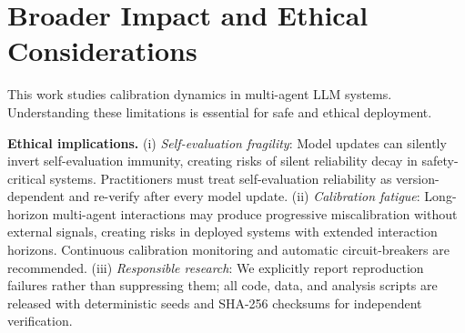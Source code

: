 \documentclass[11pt]{article}
\begin{document}
\section*{Broader Impact and Ethical Considerations}
\label{sec:ethics}

This work studies calibration dynamics in multi-agent LLM systems. Understanding these limitations is essential for safe and ethical deployment.

\textbf{Ethical implications.} (i) \textit{Self-evaluation fragility}: Model updates can silently invert self-evaluation immunity, creating risks of silent reliability decay in safety-critical systems. Practitioners must treat self-evaluation reliability as version-dependent and re-verify after every model update. (ii) \textit{Calibration fatigue}: Long-horizon multi-agent interactions may produce progressive miscalibration without external signals, creating risks in deployed systems with extended interaction horizons. Continuous calibration monitoring and automatic circuit-breakers are recommended. (iii) \textit{Responsible research}: We explicitly report reproduction failures rather than suppressing them; all code, data, and analysis scripts are released with deterministic seeds and SHA-256 checksums for independent verification.
\end{document}

